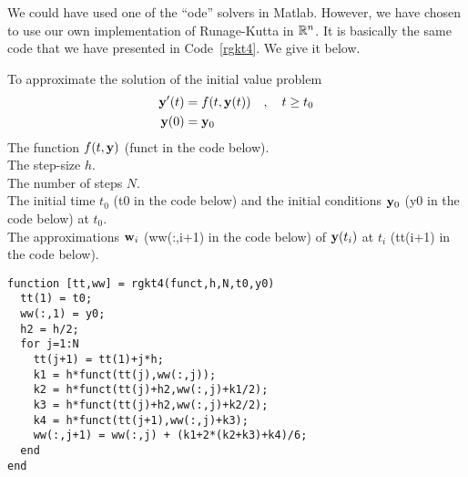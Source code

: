 We could have used one of the ``ode'' solvers in Matlab.  However, we
have chosen to use our own implementation of Runage-Kutta in $\mathbb{R}^n$.
It is basically the same code that we have presented in
Code~\ref{rgkt4}.  We give it below.

\begin{code}
To approximate the solution of the initial value problem
\[
\begin{split}
\mathbf{y}'(t) &= f(t,\mathbf{y}(t)) \quad , \quad t \geq t_0 \\
\mathbf{y}(0) &= \mathbf{y}_0
\end{split}
\]
 The function $f(t,\mathbf{y})$ (funct in the code below). \\
The step-size $h$.\\
The number of steps $N$.\\
The initial time $t_0$ (t0 in the code below) and the initial
conditions $\mathbf{y}_0$ (y0 in the code below) at $t_0$.\\
 The approximations $\mathbf{w}_i$ (ww(:,i+1) in the code below)
of $\mathbf{y}(t_i)$ at $t_i$ (tt(i+1) in the code below).
\small
\begin{verbatim}
function [tt,ww] = rgkt4(funct,h,N,t0,y0)
  tt(1) = t0;
  ww(:,1) = y0;
  h2 = h/2;
  for j=1:N
    tt(j+1) = tt(1)+j*h;
    k1 = h*funct(tt(j),ww(:,j));
    k2 = h*funct(tt(j)+h2,ww(:,j)+k1/2);
    k3 = h*funct(tt(j)+h2,ww(:,j)+k2/2);
    k4 = h*funct(tt(j+1),ww(:,j)+k3);
    ww(:,j+1) = ww(:,j) + (k1+2*(k2+k3)+k4)/6;
  end
end
\end{verbatim}
\end{code}

